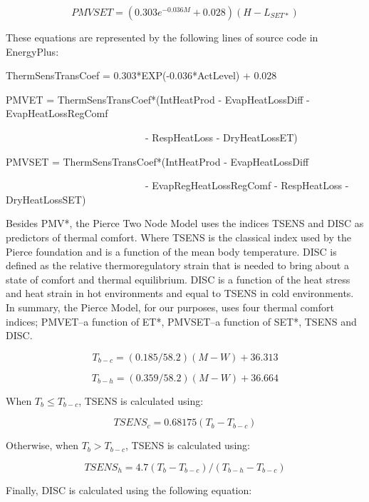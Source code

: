 \begin{equation}
PMVSET = (0.303{e^{ - 0.036M}} + 0.028)(H - {L_{SET*}})
\end{equation}

These equations are represented by the following lines of source code in EnergyPlus:

ThermSensTransCoef = 0.303*EXP(-0.036*ActLevel) + 0.028

PMVET = ThermSensTransCoef*(IntHeatProd - EvapHeatLossDiff - EvapHeatLossRegComf

~~~~~~~~~~~~~~~~~~~~~~~~~~~~- RespHeatLoss - DryHeatLossET)

PMVSET = ThermSensTransCoef*(IntHeatProd - EvapHeatLossDiff

~~~~~~~~~~~~~~~~~~~~~~~~~~~~- EvapRegHeatLossRegComf - RespHeatLoss - DryHeatLossSET)

Besides PMV*, the Pierce Two Node Model uses the indices TSENS and DISC as predictors of thermal comfort. Where TSENS is the classical index used by the Pierce foundation and is a function of the mean body temperature. DISC is defined as the relative thermoregulatory strain that is needed to bring about a state of comfort and thermal equilibrium. DISC is a function of the heat stress and heat strain in hot environments and equal to TSENS in cold environments. In summary, the Pierce Model, for our purposes, uses four thermal comfort indices; PMVET--a function of ET*, PMVSET--a function of SET*, TSENS and DISC.

\begin{equation}
{T_{b - c}} = (0.185/58.2)(M - W) + 36.313
\end{equation}

\begin{equation}
{T_{b - h}} = (0.359/58.2)(M - W) + 36.664
\end{equation}

When \({T_b} \le {T_{b - c}}\), TSENS is calculated using:

\begin{equation}
TSEN{S_c} = 0.68175({T_b} - {T_{b - c}})
\end{equation}

Otherwise, when \({T_b} > {T_{b - c}}\), TSENS is calculated using:

\begin{equation}
TSEN{S_h} = 4.7({T_b} - {T_{b - c}})/({T_{b - h}} - {T_{b - c}})
\end{equation}

Finally, DISC is calculated using the following equation:

